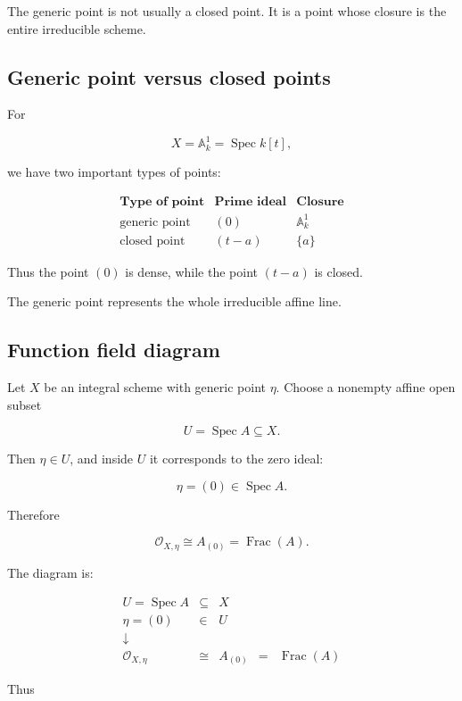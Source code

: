 \documentclass[12pt,a4paper]{article}
\theoremstyle{notespace}
\begin{document}
The generic point is not usually a closed point. It is a point whose closure is the entire irreducible scheme.

\subsection{Generic point versus closed points}

For

\[
X=\mathbb A_k^1=\operatorname{Spec}k[t],
\]

we have two important types of points:

\[
\begin{array}{c|c|c}
	\textbf{Type of point}
	&
	\textbf{Prime ideal}
	&
	\textbf{Closure}
	\\
	\hline
	\text{generic point}
	&
	(0)
	&
	\mathbb A_k^1
	\\[5pt]
	\text{closed point}
	&
	(t-a)
	&
	\{a\}
\end{array}
\]

Thus the point \((0)\) is dense, while the point \((t-a)\) is closed.

The generic point represents the whole irreducible affine line.

\subsection{Function field diagram}

Let \(X\) be an integral scheme with generic point \(\eta\). Choose a nonempty affine open subset

\[
U=\operatorname{Spec}A\subseteq X.
\]

Then \(\eta\in U\), and inside \(U\) it corresponds to the zero ideal:

\[
\eta=(0)\in \operatorname{Spec}A.
\]

Therefore

\[
\mathcal O_{X,\eta}
\cong
A_{(0)}
=
\operatorname{Frac}(A).
\]

The diagram is:

\[
\begin{array}{ccccc}
	U=\operatorname{Spec}A
	&\subseteq&
	X
	\\[6pt]
	\eta=(0)
	&\in&
	U
	\\[6pt]
	\downarrow
	&&
	\\[-2pt]
	\mathcal O_{X,\eta}
	&\cong&
	A_{(0)}
	&=&
	\operatorname{Frac}(A)
\end{array}
\]

Thus
\end{document}
